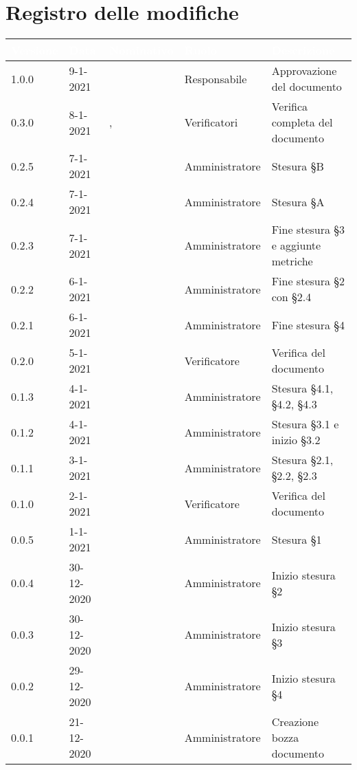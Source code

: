 \section*{Registro delle modifiche}
\setcounter{table}{-1}
{
\renewcommand{\arraystretch}{1.5}
\centering
\begin{longtable}{C{1.7cm} C{2.5cm} C{3.2cm} C{2.7cm} C{4.8cm}}
\textcolor{white}{\textbf{Versione}}&
\textcolor{white}{\textbf{Data}}&
\textcolor{white}{\textbf{Nominativo}}&
\textcolor{white}{\textbf{Ruolo}}&
\textcolor{white}{\textbf{Descrizione}}\\	
\endhead

1.0.0 & 9-1-2021 & \BM{} & Responsabile & Approvazione del documento \\
0.3.0 & 8-1-2021 & \SP{}, \BM{} & Verificatori & Verifica completa del documento \\
0.2.5 & 7-1-2021 & \RA{} & Amministratore & Stesura \S B \\
0.2.4 & 7-1-2021 & \PA{} & Amministratore & Stesura \S A \\
0.2.3 & 7-1-2021 & \ZM{} & Amministratore & Fine stesura \S 3 e aggiunte metriche \\
0.2.2 & 6-1-2021 & \PA{} & Amministratore & Fine stesura \S 2 con \S 2.4   \\
0.2.1 & 6-1-2021 & \RA{} & Amministratore & Fine stesura \S 4\\
0.2.0 & 5-1-2021 & \BM{} & Verificatore & Verifica del documento \\
0.1.3 & 4-1-2021 & \RA{} & Amministratore & Stesura \S 4.1, \S 4.2, \S 4.3 \\
0.1.2 & 4-1-2021 & \ZM{} & Amministratore & Stesura \S 3.1 e inizio \S 3.2\\
0.1.1 & 3-1-2021 & \PA{} & Amministratore & Stesura \S 2.1, \S 2.2, \S 2.3 \\
0.1.0 & 2-1-2021 & \BM{} & Verificatore & Verifica del documento \\
0.0.5 & 1-1-2021 & \ZM{} & Amministratore & Stesura \S 1\\
0.0.4 & 30-12-2020 & \PA{} & Amministratore & Inizio stesura \S 2 \\
0.0.3 & 30-12-2020 & \ZM{} & Amministratore & Inizio stesura \S 3\\
0.0.2 & 29-12-2020 & \RA{} & Amministratore & Inizio stesura \S 4 \\
0.0.1 & 21-12-2020 & \ZM{} & Amministratore & Creazione bozza documento \\	
\end{longtable}
}
